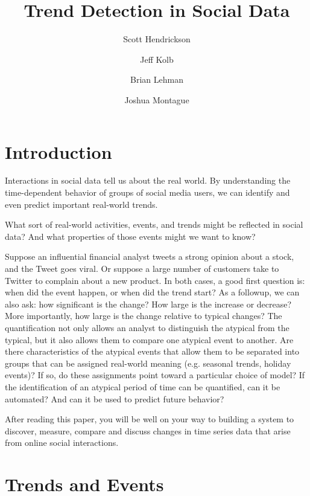 \documentclass{article}
\title{Trend Detection in Social Data}
\author[]{Scott Hendrickson}
\author[]{Jeff Kolb}
\author[]{Brian Lehman}
\author[]{Joshua Montague}
\affil[]{ \Large{Twitter, Inc.} }
\begin{document}
\maketitle

\frenchspacing

\section{Introduction}
\label{intro}

Interactions in social data tell us about the real world. By
understanding the time-dependent behavior of groups of social media users, we
can identify and even predict important real-world trends. 

What sort of real-world activities, events, and trends might be reflected in
social data? And what properties of those events might we want to know?

Suppose an influential financial analyst tweets a strong opinion about a stock,
and the Tweet goes viral. Or suppose a large number of customers take to
Twitter to complain about a new product. In both cases, a good first question
is: when did the event happen, or when did the trend start? As a followup, we
can also ask: how significant is the change? How large is the increase or
decrease? More importantly, how large is the change relative to typical
changes? The quantification not only allows an analyst to distinguish the
atypical from the typical, but it also allows them to compare one atypical
event to another. Are there characteristics of the atypical events that allow
them to be separated into groups that can be assigned real-world meaning (e.g.
seasonal trends, holiday events)? If so, do these assignments point toward a
particular choice of model? If the identification of an atypical period of time
can be quantified, can it be automated? And can it be used to predict future
behavior?

After reading this paper, you will be well on your way to building a system to
discover, measure, compare and discuss changes in time series data that arise
from online social interactions.

\section{Trends and Events}  
\label{definitions}
\end{document}
